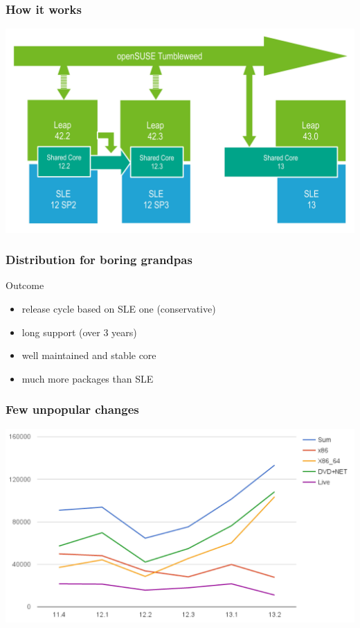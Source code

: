 \documentclass{beamer}
\begin{document}
\begin{frame}
\frametitle{How it works}
\begin{center}
\includegraphics[width=.8\paperwidth]{leap-43}
\end{center}
\end{frame}

\begin{frame}[t]
\frametitle{Distribution for boring grandpas}
Outcome
\begin{itemize}
\item release cycle based on SLE one (conservative)
\item long support (over 3 years)
\item well maintained and stable core
\item much more packages than SLE
\end{itemize}
\end{frame}

\begin{frame}
\frametitle{Few unpopular changes}
\begin{center}
\includegraphics[width=.8\paperwidth]{downloads}
\end{center}
\end{frame}
\end{document}
